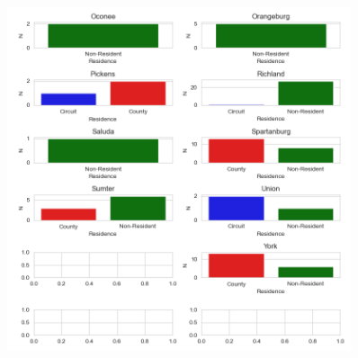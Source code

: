 \documentclass[11pt]{article}
\begin{document}
      \begin{figure}[H]
        \centering
        \includegraphics[width=0.9\textwidth]{../../../output/figures/Exploration/county_trial_hist_3.png}
      \end{figure}
\end{document}
